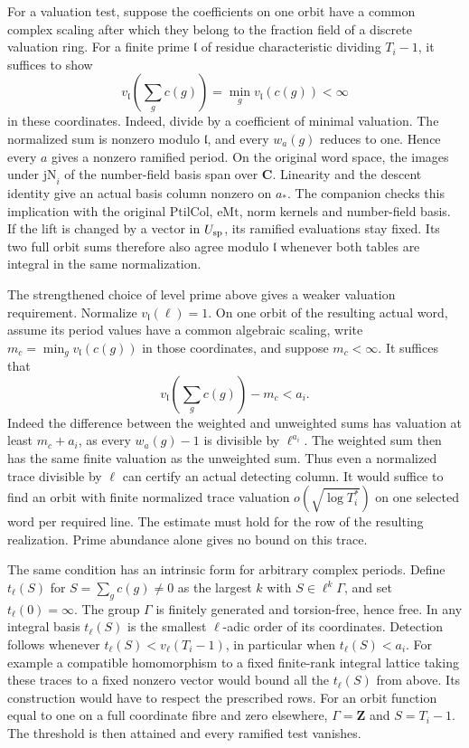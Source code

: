 For a valuation test, suppose the coefficients on one orbit have a common
complex scaling after which they belong to the fraction field of a
discrete valuation ring. For a finite prime \(\mathfrak l\) of
residue characteristic dividing \(T_i-1\), it suffices to show
\[
 v_{\mathfrak l}\!\left(\sum_g c(g)\right)
       =\min_g v_{\mathfrak l}(c(g))<\infty
\]
in these coordinates. Indeed, divide by a coefficient of minimal
valuation. The normalized sum is nonzero modulo \(\mathfrak l\), and
every \(w_a(g)\) reduces to one. Hence every \(a\) gives a nonzero
ramified period. On the original word space, the images under
\(\mathrm{jN}_i\) of the number-field basis span over \(\mathbf C\).
Linearity and the descent identity give an actual basis column
nonzero on \(a_*\). The companion 
checks this implication with the original \(\mathrm{PtilCol}\),
\(\mathrm{eMt}\), norm kernels and number-field basis. If the
lift is changed by a vector in \(U_{\rm sp}\), its ramified
evaluations stay fixed. Its two full orbit sums therefore also
agree modulo \(\mathfrak l\) whenever both tables are integral in
the same normalization.

The strengthened choice of level prime above gives a weaker
valuation requirement. Normalize \(v_{\mathfrak l}(\ell)=1\).
On one orbit of the resulting actual word, assume its period values
have a common algebraic scaling, write \(m_c=\min_g v_{\mathfrak l}(c(g))\)
in those coordinates, and suppose \(m_c<\infty\). It suffices that
\[
       v_{\mathfrak l}\!\left(\sum_g c(g)\right)-m_c<a_i .
\]
Indeed the difference between the weighted and unweighted sums
has valuation at least \(m_c+a_i\), as every \(w_a(g)-1\) is
divisible by \(\ell^{a_i}\). The weighted sum then has the same
finite valuation as the unweighted sum. Thus even a normalized
trace divisible by \(\ell\) can certify an actual detecting column.
It would suffice to find an orbit with finite normalized trace
valuation \(o(\sqrt{\log T_i^*})\) on one selected word per
required line. The estimate must hold for the row of the resulting
realization. Prime abundance alone gives no bound on this trace.

The same condition has an intrinsic form for arbitrary complex
periods. Define \(t_\ell(S)\) for \(S=\sum_g c(g)\ne0\) as the
largest \(k\) with \(S\in\ell^k\Gamma\), and set \(t_\ell(0)=\infty\).
The group \(\Gamma\) is finitely generated and torsion-free, hence
free. In any integral basis \(t_\ell(S)\) is the smallest
\(\ell\)-adic order of its coordinates. Detection follows whenever
\(t_\ell(S)<v_\ell(T_i-1)\), in particular when \(t_\ell(S)<a_i\).
For example a compatible homomorphism to a fixed finite-rank
integral lattice taking these traces to a fixed nonzero vector
would bound all the \(t_\ell(S)\) from above. Its construction
would have to respect the prescribed rows. For an orbit function
equal to one on a full coordinate fibre and zero elsewhere,
\(\Gamma=\mathbf Z\) and \(S=T_i-1\). The threshold is then
attained and every ramified test vanishes.

